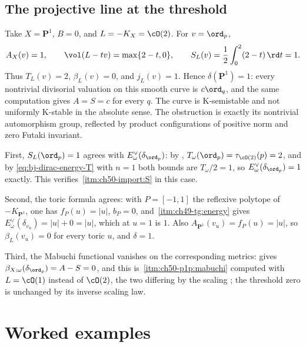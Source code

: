 \subsection{The projective line at the threshold}
\label{sec:ch50-p1-delta}

\begin{example}
\label{ex:stability-p1-delta}
Take $X=\mathbf P^1$, $B=0$, and $L=-K_X=\cO(2)$.  For
$v=\ord_p$,
\[
 A_X(v)=1,\qquad
 \vol(L-tv)=\max\{2-t,0\},\qquad
 S_L(v)=\frac12\int_0^2(2-t)\,\rd t=1.
\]
Thus $T_L(v)=2$, $\beta_L(v)=0$, and $j_L(v)=1$.  Hence
$\delta(\mathbf P^1)=1$: every nontrivial divisorial valuation on
this smooth curve is $c\ord_q$, and the same computation gives
$A=S=c$ for every $q$.  The curve is K-semistable and not uniformly
K-stable in the absolute sense.  The obstruction is exactly its
nontrivial automorphism group, reflected by product configurations of
positive norm and zero Futaki invariant.
\end{example}

\begin{remark}
\label{rem:ch50-p1-delta-checks}
First, $S_L(\ord_p)=1$ agrees with $E^\vee_\omega(\delta_{\ord_p})$:
by , $T_\omega(\ord_p)=\tau_{\cO(2)}(p)=2$,
and by \eqref{eq:bj-dirac-energy-T} with $n=1$ both bounds are
$T_\omega/2=1$, so $E^\vee_\omega(\delta_{\ord_p})=1$ exactly.  This
verifies \,\cref{itm:ch50-import:S} in this case.

Second, the toric formula agrees: with $P=[-1,1]$ the reflexive polytope
of $-K_{\mathbf P^1}$, one has $f_P(u)=|u|$, $b_P=0$, and
\,\cref{itm:ch49-tg:energy} gives
$E^\vee_\omega(\delta_{v_u})=|u|+0=|u|$, which at $u=1$ is $1$.  Also
$A_{\mathbf P^1}(v_u)=f_P(u)=|u|$, so $\beta_L(v_u)=0$ for every toric
$u$, and $\delta=1$.

Third, the Mabuchi functional vanishes on the corresponding metrics:
 gives
$\beta_{X;\omega}(\delta_{\ord_p})=A-S=0$, and this is
\,\cref{itm:ch50-p1p:mabuchi} computed with
$L=\cO(1)$ instead of $\cO(2)$, the two differing by the scaling
; the threshold zero is unchanged
by its inverse scaling law.
\end{remark}

\section{Worked examples}
\label{sec:ch50-examples}

